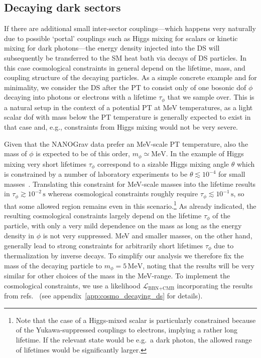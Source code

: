 \subsection{Decaying dark sectors}
If there are additional small inter-sector couplings---which happens very naturally due to possible `portal' couplings such as Higgs mixing for scalars or kinetic mixing for dark photons---the energy density injected into the \ac{DS} will subsequently be  transferred to the \ac{SM} heat bath via decays of \ac{DS} particles. In this case cosmological constraints in general depend on the lifetime, mass, and coupling structure of the decaying particles. As a simple concrete example and for minimality, we consider the \ac{DS} after the \ac{PT} to consist only of one bosonic \ac{dof} $\phi$ decaying into photons or electrons with a lifetime $\tau_\phi$ that we sample over. This is a natural setup in the context of a potential \ac{PT} at MeV temperatures, as a light scalar \ac{dof} with mass below the \ac{PT} temperature is generally expected to exist in that case and, e.g., constraints from Higgs mixing would not be very severe.

Given that the \ac{NANOGrav} data prefer an MeV-scale \ac{PT} temperature, also the mass of $\phi$ is expected to be of this order, $m_\phi \simeq \mathrm{MeV}$. In the example of Higgs mixing very short lifetimes $\tau_\phi$ correspond to a sizable Higgs mixing angle $\theta$  which is constrained by a number of laboratory experiments to be $\theta \lesssim 10^{-4}$ for small masses~\cite{Winkler:2018qyg,Ferber:2023iso}. Translating this constraint for MeV-scale masses into the lifetime results in $\tau_\phi \gtrsim 10^{-2} \, \mathrm{s}$ whereas cosmological constraints roughly require $\tau_\phi \lesssim 10^{-1} \, \mathrm{s}$,  so that some allowed region remains even in this scenario.\footnote{Note that the case of a Higgs-mixed scalar is particularly constrained because of the Yukawa-suppressed couplings to electrons, implying a rather long lifetime. If the relevant state would be e.g.~a dark photon, the allowed range of lifetimes would be significantly larger.} As already indicated, the resulting cosmological constraints largely depend on the lifetime $\tau_\phi$ of the particle, with only a very mild dependence on the mass as long as the energy density in $\phi$ is not very suppressed. MeV and smaller masses, on the other hand, generally lead to strong constraints for arbitrarily short lifetimes $\tau_\phi$ due to thermalization by inverse decays. To simplify our analysis we therefore fix the mass of the decaying particle to $m_\phi = 5 \, \mathrm{MeV}$, noting that the results will be very similar for other choices of the mass in the MeV-range. To implement the cosmological constraints, we use a likelihood $\mathcal{L}_{\text{BBN} + \text{CMB}}$ incorporating the results from refs.~\cite{Depta:2020zbh,Bai:2021ibt} (see appendix~\ref{app:cosmo_decaying_ds} for details).


